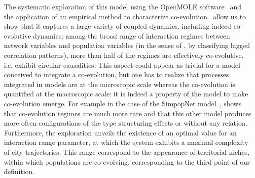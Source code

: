 \documentclass[11pt]{article}
\begin{document}
The systematic exploration of this model using the OpenMOLE software~\citep{reuillon2013openmole} and the application of an empirical method to characterize co-evolution~\citep{raimbault2017identification} allow us to show that it captures a large variety of coupled dynamics, including indeed co-evolutive dynamics: among the broad range of interaction regimes between network variables and population variables (in the sense of \cite{raimbault2017identification}, by classifying lagged correlation patterns), more than half of the regimes are effectively co-evolutive, i.e. exhibit circular causalities. This aspect could appear as trivial for a model conceived to integrate a co-evolution, but one has to realize that processes integrated in models are at the microscopic scale whereas the co-evolution is quantified at the macroscopic scale: it is indeed a property of the model to make co-evolution emerge. For example in the case of the SimpopNet model~\citep{schmitt2014modelisation}, \cite{raimbault2018unveiling} shows that co-evolution regimes are much more rare and that this other model produces more often configurations of the type structuring effects or without any relation. Furthermore, the exploration unveils the existence of an optimal value for an interaction range parameter, at which the system exhibits a maximal complexity of city trajectories. This range correspond to the appearance of territorial niches, within which populations are co-evolving, corresponding to the third point of our definition.
\end{document}
